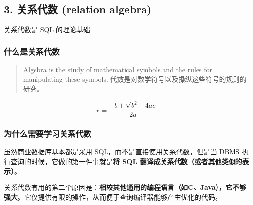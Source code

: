 \documentclass[aspectratio=169, 14pt]{beamer}
\begin{document}
\begin{frame}
    \section{\textcolor{darkmidnightblue}{3. 关系代数 (relation algebra)}} 
    关系代数是 SQL 的理论基础
\end{frame}

\begin{frame}
    \frametitle{什么是关系代数}
    \begin{quote}
        Algebra is the study of mathematical symbols and the rules for manipulating these symbols. 
代数是对数学符号以及操纵这些符号的规则的研究。
    \end{quote}

    \[x = \frac{-b \pm \sqrt{b^2 - 4ac}}{2a}\]

    
\end{frame}

\begin{frame}
    \frametitle{为什么需要学习关系代数}    
虽然商业数据库基本都是采用 SQL，而不是直接使用关系代数，但是当 DBMS 执行查询的时候，它做的第一件事就是\textbf{将 SQL 翻译成关系代数（或者其他类似的表示）}。

\pause

关系代数有用的第二个原因是：\textbf{相较其他通用的编程语言（如C、Java），它不够强大}。它仅提供有限的操作，从而便于查询编译器能够产生优化的代码。

\end{frame}
\end{document}
